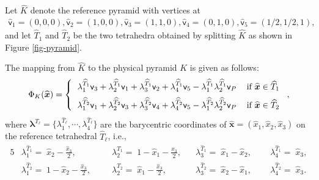 \documentclass[twoside,reqno,final]{amsart}
\renewcommand{\b}[1]{{\boldsymbol{#1}}}
\newcommand{\vt}{\mathsf{v}}
\begin{document}
Let $\widehat{K}$ denote the reference pyramid with vertices at
\begin{align}
\label{pyr}
 \hat{\vt}_1 = (0,0,0), 
\hat{\vt}_2 = (1,0,0), 
\hat{\vt}_3 = (1,1,0), 
\hat{\vt}_4 = (0,1,0), 
\hat{\vt}_5 = (1/2,1/2,1),
\end{align}
and let $\widehat{T}_1$ and $\widehat{T}_2$ 
be the two tetrahedra obtained by splitting $\widehat{K}$
as shown in Figure \ref{fig-pyramid}.

The mapping from $\widehat{K}$ to the physical pyramid $K$ is given as follows:
\begin{align}
\label{mapping-pyr}
 \Phi_K(\widehat{\b x}) = 
  \left\{ \begin{tabular}{l l}
            $\lambda_1^{\widehat{T}_1} \vt_3+\lambda_2^{\widehat{T}_1} \vt_1+
            \lambda_3^{\widehat{T}_1} \vt_2+\lambda_4^{\widehat{T}_1} \vt_5-
            \lambda_1^{\widehat{T}_1} \lambda_2^{\widehat{T}_1} \vt_P$ & if $\widehat{\b x}\in \widehat{T}_1$\vspace{0.2cm}\\
            $\lambda_1^{\widehat{T}_2} \vt_1+\lambda_2^{\widehat{T}_2} \vt_3+
            \lambda_3^{\widehat{T}_2} \vt_4+\lambda_4^{\widehat{T}_2} \vt_5-
            \lambda_1^{\widehat{T}_2} \lambda_2^{\widehat{T}_2} \vt_P$ & if $\widehat{\b x}\in\widehat{T}_2$
            \end{tabular}\right.,
\end{align}
where $\b\lambda^{\widehat{T}_\ell}=\{\lambda_1^{\widehat{T}_\ell},\cdots, \lambda_4^{\widehat{T}_\ell}\}$ are 
the barycentric coordinates of $\widehat{\b x} = (\hat x_1, \hat x_2,\hat x_3)$ on the reference tetrahedral $\widehat{T}_\ell$, i.e.,
\begin{alignat*}{5}
&\lambda_1^{\widehat{T}_1} = \; \hat x_2-\frac{\hat x_3}{2}, 
&&\lambda_2^{\widehat{T}_1} =\; 1-\hat x_1-\frac{\hat x_3}{2}, \;\;\;
&\lambda_3^{\widehat{T}_1} =\; \hat x_1-\hat x_2, \;\;
&&\lambda_4^{\widehat{T}_1} =\;\hat x_3, \\
&\lambda_1^{\widehat{T}_2} =\; 1-\hat x_2-\frac{\hat x_3}{2}, \;\;\;
&&\lambda_2^{\widehat{T}_2} =\; \hat x_1-\frac{\hat x_3}{2}, \;\;
&\lambda_3^{\widehat{T}_2} =\; \hat x_2-\hat x_1, \;\;
&&\lambda_4^{\widehat{T}_2} =\;\hat x_3.
\end{alignat*}

\end{document}

